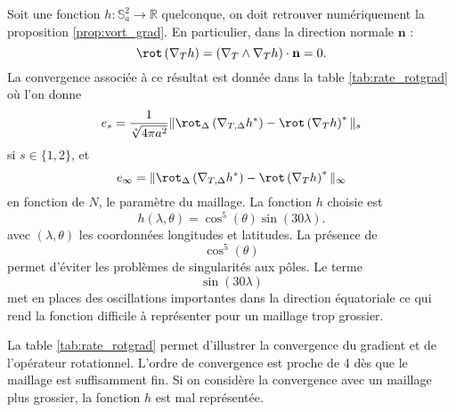 Soit une fonction $h : \mathbb{S}_a^2 \rightarrow \mathbb{R}$ quelconque, on doit retrouver numériquement la proposition \ref{prop:vort_grad}. En particulier, dans la direction normale $\mathbf{n}$ : 
\begin{equation}
\rot\left( \nabla_T h \right) = \left( \nabla_T \wedge \nabla_T h \right) \cdot \mathbf{n} = 0.
\label{eq:rot_grad}
\end{equation}
La convergence associée à ce résultat est donnée dans la table \ref{tab:rate_rotgrad} où l'on donne
\begin{equation}
e_s = \dfrac{1}{\sqrt[s]{4 \pi a^2}} \| \rot_{\Delta} \left( \nabla_{T,\Delta} h^* \right) - \rot \left( \nabla_{T} h \right)^* \|_s
\end{equation}
si $s\in \{ 1,2 \}$, et
\begin{equation}
e_{\infty} =  \| \rot_{\Delta} \left( \nabla_{T,\Delta} h^* \right) - \rot \left( \nabla_{T} h \right)^* \|_{\infty}
\end{equation}
en fonction de $N$, le paramètre du maillage. La fonction $h$ choisie est 
\begin{equation}
h(\lambda, \theta) = \cos^5 ( \theta ) \sin ( 30 \lambda ).
\end{equation}
avec $(\lambda, \theta)$ les coordonnées longitudes et latitudes.
La présence de $$\cos^5 (\theta)$$ permet d'éviter les problèmes de singularités aux pôles. Le terme $$\sin ( 30 \lambda)$$ met en places des oscillations importantes dans la direction équatoriale ce qui rend la fonction difficile à représenter pour un maillage trop grossier.

La table \ref{tab:rate_rotgrad} permet d'illustrer la convergence du gradient et de l'opérateur rotationnel. L'ordre de convergence est proche de 4 dès que le maillage est suffisamment fin. Si on considère la convergence avec un maillage plus grossier, la fonction $h$ est mal représentée.

